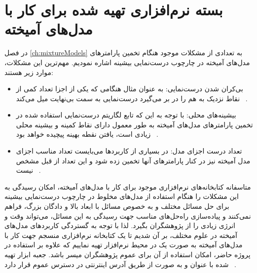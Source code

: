 \chapter{بسته نرم‌افزاری تهیه شده برای کار با مدل‌های آمیخته} \label{ch:mixest}
در فصل
\ref{ch:mixtureModels}
به تعدادی از مشکلات موجود هنگام تخمین پارامترهای مدل‌های آمیخته در چارچوب درست‌نمایی بیشینه اشاره نمودیم.
مهم‌ترین این مشکلات، موارد زیر هستند:

\begin{itemize}
\item 
بی‌کران شدن درست‌نمایی: به عنوان مثال هنگامی که یکی از اجزا تعداد کمی از نقاط نزدیک به هم را در بر می‌گیرد درست‌نمایی به سمت بی‌نهایت میل می‌کند%
~\cite{ciuperca_penalized_2003}.

\item
بیشینه‌های محلی: با توجه به این که تابع لگاریتم درست‌نمایی استفاده شده در تخمین پارامترهای مدل‌های آمیخته به طور معمول دارای نقاط کمینه و بیشینه محلی زیادی است، یافتن نقطه بهینه پیچیده خواهد بود%
~\cite{ueda_split_2000}.

\item
تعداد درست اجزای مدل: در بسیاری از کاربردها می‌بایست تعداد مناسب اجزای مدل آمیخته نیز در کنار پارامترهای آنها تخمین زده شود و این تعداد از قبل مشخص نیست%
~\cite{khalili_variable_2007}.
\end{itemize}

متاسفانه کتابخانه‌های نرم‌افزاری موجود برای کار با مدل‌های آمیخته، امکان رسیدگی به این مشکلات را هنگام استفاده از مدل‌های مخلوط در چارچوب درست‌نمایی بیشینه برای حل مسائل مختلف و به خصوص مسائل با ابعاد بالا و دادگان بزرگ، فراهم نمی‌کنند و پیاده‌سازی راه‌حل‌های مناسب جهت رسیدگی به این مسائل، می‌تواند وقت و انرژی زیادی را از پژوهشگران بگیرد.
لذا با توجه به گستردگی کاربردهای مدل‌های آمیخته در علوم مختلف، بر آن شدیم تا یک کتابخانه نرم‌افزاری منسجم جهت کار با مدل‌های آمیخته به صورت یک
{}
در محیط نرم‌افزار  تهیه نماییم که علاوه بر استفاده در پروژه حاضر، امکان استفاده از آن برای عموم پژوهشگران میسر باشد.
جعبه ابزار تهیه شده با عنوان
و به صورت
{}
از طریق آدرس اینترنتی
در دسترس عموم قرار دارد%
~\cite{hosseini_mixest_toappear}.


